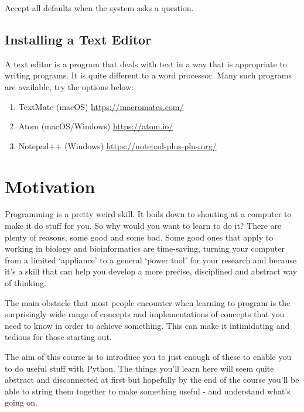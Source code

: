 \documentclass[]{book}
\providecommand{\tightlist}{%
  \setlength{\itemsep}{0pt}\setlength{\parskip}{0pt}}
\theoremstyle{definition}
\theoremstyle{definition}
\theoremstyle{definition}
\theoremstyle{remark}
\begin{document}
Accept all defaults when the system asks a question.

\hypertarget{installing-a-text-editor}{%
\section{Installing a Text Editor}\label{installing-a-text-editor}}

A text editor is a program that deals with text in a way that is
appropriate to writing programs. It is quite different to a word
processor. Many such programs are available, try the options below:

\begin{enumerate}
\def\labelenumi{\arabic{enumi}.}
\tightlist
\item
  TextMate (macOS) \url{https://macromates.com/}
\item
  Atom (macOS/Windows) \url{https://atom.io/}
\item
  Notepad++ (Windows) \url{https://notepad-plus-plus.org/}
\end{enumerate}

\hypertarget{motivation}{%
\chapter{Motivation}\label{motivation}}

Programming is a pretty weird skill. It boils down to shouting at a
computer to make it do stuff for you. So why would you want to learn to
do it? There are plenty of reasons, some good and some bad. Some good
ones that apply to working in biology and bioinformatics are
time-saving, turning your computer from a limited `appliance' to a
general `power tool' for your research and because it's a skill that can
help you develop a more precise, disciplined and abstract way of
thinking.

The main obstacle that most people encounter when learning to program is
the surprisingly wide range of concepts and implementations of concepts
that you need to know in order to achieve something. This can make it
intimidating and tedious for those starting out.

The aim of this course is to introduce you to just enough of these to
enable you to do useful stuff with Python. The things you'll learn here
will seem quite abstract and disconnected at first but hopefully by the
end of the course you'll be able to string them together to make
something useful - and understand what's going on.
\end{document}
